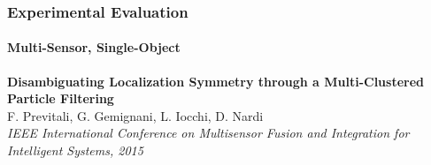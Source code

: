 \begin{frame}
	\frametitle{Experimental Evaluation}
	\framesubtitle{Multi-Sensor, Single-Object}
	
	\vspace{-0.1cm}
	
	\begin{center}
	\end{center}
	
	\vspace{0.512cm}
	
	\tiny
	
	\textbf{Disambiguating Localization Symmetry through a Multi-Clustered Particle Filtering} \\
	F. Previtali, G. Gemignani, L. Iocchi, D. Nardi \\
	\emph{IEEE International Conference on Multisensor Fusion and Integration for Intelligent Systems,
	2015} \\
\end{frame}


